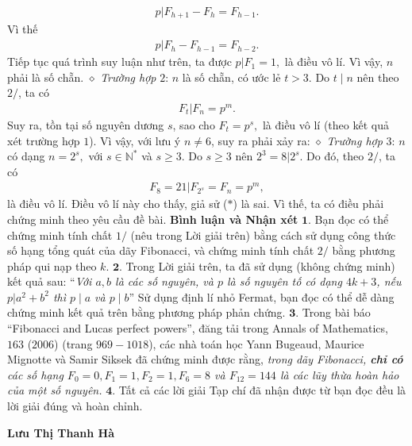 \begin{multicols}{2}
	\begin{align*}
		p|{F_{h + 1}} - {F_h} = {F_{h - 1}}.
	\end{align*}
	Vì thế
	\begin{align*}
		p|{F_h} - {F_{h - 1}} = {F_{h - 2}}.
	\end{align*}
	Tiếp tục quá trình suy luận như trên, ta được $p|{F_1} = 1,$  là điều vô lí. Vì vậy, $n$ phải là số chẵn.
	\vskip 0.05cm
	$\diamond$ \textit{Trường hợp} $2$: $n$ là số chẵn, có ước lẻ $t > 3$.
	\vskip 0.05cm
	Do $t \mid n $  nên theo $2/$, ta có
	\begin{align*}
		{F_t}|{F_n} = {p^m}. 
	\end{align*}
	Suy ra, tồn tại số nguyên dương $s$, sao cho ${F_t} = {p^s},$ là điều vô lí (theo kết quả xét trường hợp $1$). Vì vậy, với lưu ý $n \ne 6$, suy ra phải xảy ra:
	\vskip 0.05cm
	$\diamond$ \textit{Trường hợp} $3$: $n$ có dạng $n = {2^s},$ với $s \in \mathbb{N^*}$ và $s \ge 3$.
	\vskip 0.05cm
	Do $s \ge 3$ nên  ${2^3} = 8|{2^s}$. Do đó, theo $2/$, ta có
	\begin{align*}
		{F_8} = 21|{F_{{2^s}}} = {F_n} = {p^m},
	\end{align*}
	là điều vô lí. Điều vô lí này cho thấy, giả sử ($*$) là sai. Vì thế, ta có điều phải chứng minh theo yêu cầu đề bài.
	\vskip 0.05cm
	\textbf{\color{thachthuctoanhoc}Bình luận và Nhận xét}
	\vskip 0.05cm
	$\pmb{1.}$ Bạn đọc có thể chứng minh tính chất $1/$ (nêu trong Lời giải trên) bằng cách sử dụng công thức số hạng tổng quát của dãy Fibonacci, và chứng minh tính chất $2/$ bằng phương pháp qui nạp theo $k$.
	\vskip 0.05cm
	$\pmb{2.}$ Trong Lời giải trên, ta đã sử dụng (không chứng minh) kết quả sau:
	\vskip 0.05cm
	“\textit{Với $a, b$ là các số nguyên, và $p$ là số nguyên tố có dạng $4k + 3$, nếu $p|{a^2} + {b^2}$  thì  $p \mid a$ và  $p \mid b$}”
	\vskip 0.05cm
	Sử dụng định lí nhỏ Fermat, bạn đọc có thể dễ dàng chứng minh kết quả trên bằng phương pháp phản chứng.
	\vskip 0.05cm
	$\pmb{3.}$ Trong bài báo “Fibonacci and Lucas perfect powers”, đăng tải trong Annals of Mathematics, $163$ ($2006$) (trang $969 - 1018$), các nhà toán học Yann Bugeaud, Maurice Mignotte và Samir Siksek đã chứng minh được rằng, \textit{trong dãy Fibonacci, \textbf{\color{thachthuctoanhoc}chỉ có} các số hạng $F_0=0, F_1 = 1, F_2 = 1, F_6 = 8$ và $F_{12} = 144$ là các lũy thừa hoàn hảo của một số nguyên.}
	\vskip 0.05cm
	$\pmb{4.}$ Tất cả các lời giải Tạp chí đã nhận được từ bạn đọc đều là lời giải đúng và hoàn chỉnh.
	\begin{flushright}
		\textbf{\color{thachthuctoanhoc}Lưu Thị Thanh Hà}
	\end{flushright}
\end{multicols}

